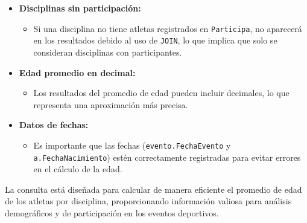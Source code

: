 \begin{itemize} \item \textbf{Disciplinas sin participación:} \begin{itemize} \item Si una disciplina no tiene atletas registrados en \texttt{Participa}, no aparecerá en los resultados debido al uso de \texttt{JOIN}, lo que implica que solo se consideran disciplinas con participantes. \end{itemize}
	
	\item \textbf{Edad promedio en decimal:} \begin{itemize} \item Los resultados del promedio de edad pueden incluir decimales, lo que representa una aproximación más precisa. \end{itemize}
	
	\item \textbf{Datos de fechas:} \begin{itemize} \item Es importante que las fechas (\texttt{evento.FechaEvento} y \texttt{a.FechaNacimiento}) estén correctamente registradas para evitar errores en el cálculo de la edad. \end{itemize} \end{itemize}

La consulta está diseñada para calcular de manera eficiente el promedio de edad de los atletas por disciplina, proporcionando información valiosa para análisis demográficos y de participación en los eventos deportivos.